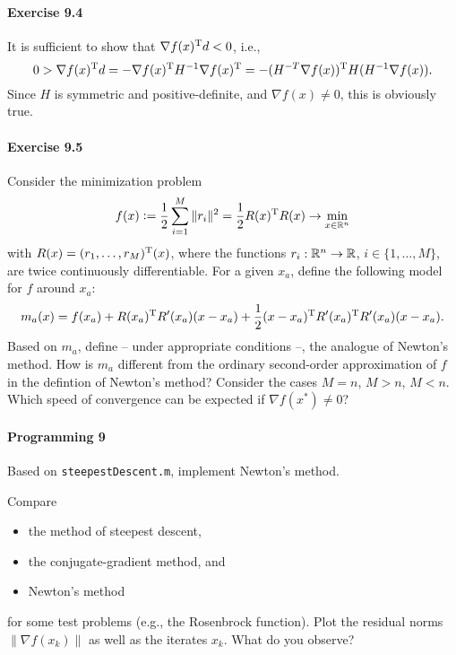 \paragraph{Exercise 9.4}
It is sufficient to show that $\nabla f(x)^{\text{\upshape T}} d < 0$, i.e.,
\[
0
> \nabla f(x)^{\text{\upshape T}} d
= - \nabla f(x)^{\text{\upshape T}} H^{-1} \nabla f(x)^{\text{\upshape T}}
= - (H^{-T} \nabla f(x))^{\text{\upshape T}} H (H^{-1} \nabla f(x)).
\]
Since $H$ is symmetric and positive-definite, and $\nabla f(x)\neq 0$, this is obviously true.


\paragraph{Exercise 9.5}
Consider the minimization problem
\[
  f(x)\mathrel{\mathop:}= \frac{1}{2}\sum_{i=1}^M\|r_i\|^2 = \frac{1}{2}R(x)^{\text{\upshape T}} R(x) \to \min_{x\in\mathbb{R}^n}
\]
with $R(x)=(r_1,\dots,r_M)^{\text{\upshape T}}(x)$, where the functions $r_i:\mathbb{R}^n\to\mathbb{R}$, $i\in\{1,\dots,M\}$, are twice continuously differentiable. For a given $x_a$, define the following model for $f$ around $x_a$:
\[
  m_a(x) = f(x_a)
         + R(x_a)^{\text{\upshape T}} R'(x_a)(x-x_a)
         + \frac{1}{2} (x-x_a)^{\text{\upshape T}} R'(x_a)^{\text{\upshape T}} R'(x_a)(x-x_a).
\]
Based on $m_a$, define -- under appropriate conditions --, the analogue of
Newton's method. How is $m_a$ different from the ordinary second-order
approximation of $f$ in the defintion of Newton's method? Consider the cases
$M=n$, $M>n$, $M<n$. Which speed of convergence can be expected if $\nabla
f(x^*)\neq 0$?

\paragraph{Programming 9}
Based on \texttt{steepestDescent.m}, implement Newton's method.

Compare
\begin{itemize}
  \item the method of steepest descent,
  \item the conjugate-gradient method, and
  \item Newton's method
\end{itemize}
for some test problems (e.g., the Rosenbrock function). Plot the residual
norms $\|\nabla f(x_k)\|$ as well as the iterates $x_k$. What do you observe?


